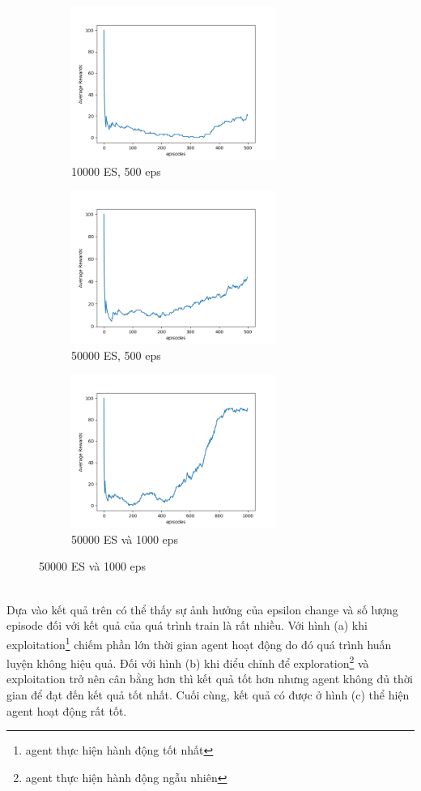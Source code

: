 \documentclass[12pt,a4paper]{article}
\begin{document}
\begin{figure}[h]
\centering
\begin{subfigure}[b]{.32\textwidth}
\includegraphics[width=0.9\linewidth, height=5cm]{pythonsection/result/result_1e_10000epsilon_500eps.png} 
\caption{10000 ES, 500 eps}
\label{fig:subim1}
\end{subfigure}
\begin{subfigure}[b]{.32\textwidth}
\includegraphics[width=0.9\linewidth, height=5cm]{pythonsection/result/result_1e_50000epsilon_500eps.png} 
\caption{50000 ES, 500 eps}
\label{fig:subim2}
\end{subfigure}
\begin{subfigure}[b]{.32\textwidth}
\includegraphics[width=0.9\linewidth, height=5cm]{pythonsection/result/result_1e_50000epsilon_1000eps.png} 
\caption{50000 ES và 1000 eps}
\label{fig:subim3}
\end{subfigure}
\end{figure}\\
Dựa vào kết quả trên có thể thấy sự ảnh hưởng của epsilon change và số lượng episode đối với kết quả của quá trình train là rất nhiều. Với hình (a) khi 
exploitation\footnote{agent thực hiện hành động tốt nhất} chiếm phần lớn thời gian agent hoạt động do đó quá trình huấn luyện không hiệu quả. Đối với hình (b) khi điểu chỉnh để exploration\footnote{agent thực hiện hành động ngẫu nhiên} và exploitation trở nên cân bằng hơn thì kết quả tốt hơn nhưng agent không đủ thời gian để đạt đến kết quả tốt nhất. Cuối cùng, kết quả có được ở hình (c) thể hiện agent hoạt động rất tốt.
\end{document}
